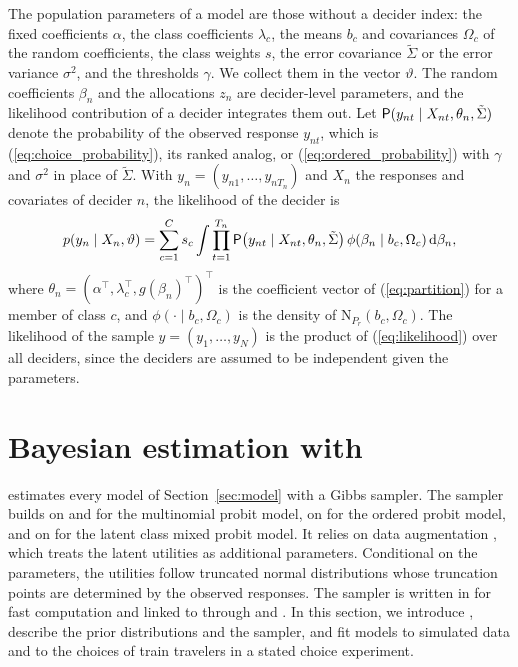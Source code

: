 \documentclass[article,shortnames]{jss}
\newcommand{\fct}[1]{\code{#1()}}
\begin{document}
The population parameters of a model are those without a decider index: the
fixed coefficients $\alpha$, the class coefficients $\lambda_c$, the means $b_c$
and covariances $\Omega_c$ of the random coefficients, the class weights $s$,
the error covariance $\tilde{\Sigma}$ or the error variance $\sigma^2$, and the
thresholds $\gamma$. We collect them in the vector $\vartheta$. The random
coefficients $\beta_n$ and the allocations $z_n$ are decider-level parameters,
and the likelihood contribution of a decider integrates them out. Let
$\mathsf{P}(y_{nt} \mid X_{nt}, \theta_n, \tilde{\Sigma})$ denote the probability of
the observed response $y_{nt}$, which is (\ref{eq:choice_probability}),
its ranked analog, or (\ref{eq:ordered_probability}) with $\gamma$ and
$\sigma^2$ in place of $\tilde{\Sigma}$. With $y_n = (y_{n1},
\dots, y_{nT_n})$ and $X_n$ the responses and covariates of decider $n$, the
likelihood of the decider is
%
\begin{equation}
  \label{eq:likelihood}
  p(y_n \mid X_n, \vartheta) = \sum_{c = 1}^{C} s_c \int \prod_{t = 1}^{T_n}
  \mathsf{P}\big(y_{nt} \mid X_{nt}, \theta_n, \tilde{\Sigma}\big)\,
  \phi(\beta_n \mid b_c, \Omega_c)\, \mathrm{d}\beta_n,
\end{equation}
%
where $\theta_n = (\alpha^\top, \lambda_c^\top, g(\beta_n)^\top)^\top$ is the
coefficient vector of (\ref{eq:partition}) for a member of class $c$, and
$\phi(\cdot \mid b_c, \Omega_c)$ is the density of $\mathrm{N}_{P_r}(b_c,
\Omega_c)$. The likelihood of the sample $y = (y_1, \dots, y_N)$ is the product
of (\ref{eq:likelihood}) over all deciders, since the deciders are
assumed to be independent given the parameters.

\section[Bayesian estimation with fit()]{Bayesian estimation with \fct{fit}}
\label{sec:estimation}

 estimates every model of Section~\ref{sec:model} with a Gibbs
sampler. The sampler builds on \citet{McCulloch1994} and \citet{Imai2005a} for
the multinomial probit model, on \citet{Albert1993} for the ordered probit
model, and on \citet{Oelschlaeger2021} for the latent class mixed probit model.
It relies on data augmentation \citep{Albert1993}, which treats the latent
utilities as additional parameters. Conditional on the parameters, the utilities
follow truncated normal distributions whose truncation points are determined by
the observed responses. The sampler is written in  for fast
computation and linked to  through 
\citep{Eddelbuettel2011} and  \citep{Eddelbuettel2014}. In
this section, we introduce \fct{fit}, describe the prior distributions and the
sampler, and fit models to simulated data and to the choices of train travelers
in a stated choice experiment.
\end{document}
